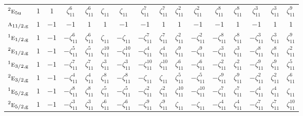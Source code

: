 \documentclass[10pt,a4paper]{article}
\makeatletter
\def\grouprule#1#2{\noalign{\marks\LTgroupmarks{\the\belowrulesep}\nobreak\vskip#1%
  \vskip\aboverulesep}\multispan\LT@cols\unskip{\leaders\hrule\@height#2\hfill\kern\z@}\cr
  \noalign{\penalty\LTrulebreak\vskip\belowrulesep\global\@lastruleclass\z@}}
\numberwithin{equation}{section}
\newcommand{\irr}[1]{\text{\normalfont\scshape #1}}
\newcommand{\conjpair}[1]{{}^{#1}}
\newcommand{\ptag}[1]{\mathrm{#1}}
\newcommand{\rootunity}[1]{\zeta_{#1}}
\makeatother
\begin{document}
{\begin{longtable}{@{}lccccccccccccccc@{}}
$\conjpair{2}\irr{e}_{5\ptag{u}}$ & $1$ & $1$ & $\rootunity{11}^{6}$ & $\rootunity{11}^{6}$ & $\rootunity{11}$ & $\rootunity{11}$ & $\rootunity{11}^{7}$ & $\rootunity{11}^{7}$ & $\rootunity{11}^{2}$ & $\rootunity{11}^{2}$ & $\rootunity{11}^{8}$ & $\rootunity{11}^{8}$ & $\rootunity{11}^{3}$ & $\rootunity{11}^{3}$ & $\rootunity{11}^{9}$\\
\grouprule{0pt}{\lightrulewidth}
$\irr{a}_{11/2,\ptag{g}}$ & $1$ & $-1$ & $-1$ & $1$ & $1$ & $-1$ & $-1$ & $1$ & $1$ & $-1$ & $-1$ & $1$ & $-1$ & $1$ & $1$\\
$\conjpair{1}\irr{e}_{1/2,\ptag{g}}$ & $1$ & $-1$ & $-\rootunity{11}^{6}$ & $\rootunity{11}^{6}$ & $\rootunity{11}$ & $-\rootunity{11}$ & $-\rootunity{11}^{7}$ & $\rootunity{11}^{7}$ & $\rootunity{11}^{2}$ & $-\rootunity{11}^{2}$ & $-\rootunity{11}^{8}$ & $\rootunity{11}^{8}$ & $-\rootunity{11}^{3}$ & $\rootunity{11}^{3}$ & $\rootunity{11}^{9}$\\
$\conjpair{2}\irr{e}_{1/2,\ptag{g}}$ & $1$ & $-1$ & $-\rootunity{11}^{5}$ & $\rootunity{11}^{5}$ & $\rootunity{11}^{10}$ & $-\rootunity{11}^{10}$ & $-\rootunity{11}^{4}$ & $\rootunity{11}^{4}$ & $\rootunity{11}^{9}$ & $-\rootunity{11}^{9}$ & $-\rootunity{11}^{3}$ & $\rootunity{11}^{3}$ & $-\rootunity{11}^{8}$ & $\rootunity{11}^{8}$ & $\rootunity{11}^{2}$\\
$\conjpair{1}\irr{e}_{3/2,\ptag{g}}$ & $1$ & $-1$ & $-\rootunity{11}^{7}$ & $\rootunity{11}^{7}$ & $\rootunity{11}^{3}$ & $-\rootunity{11}^{3}$ & $-\rootunity{11}^{10}$ & $\rootunity{11}^{10}$ & $\rootunity{11}^{6}$ & $-\rootunity{11}^{6}$ & $-\rootunity{11}^{2}$ & $\rootunity{11}^{2}$ & $-\rootunity{11}^{9}$ & $\rootunity{11}^{9}$ & $\rootunity{11}^{5}$\\
$\conjpair{2}\irr{e}_{3/2,\ptag{g}}$ & $1$ & $-1$ & $-\rootunity{11}^{4}$ & $\rootunity{11}^{4}$ & $\rootunity{11}^{8}$ & $-\rootunity{11}^{8}$ & $-\rootunity{11}$ & $\rootunity{11}$ & $\rootunity{11}^{5}$ & $-\rootunity{11}^{5}$ & $-\rootunity{11}^{9}$ & $\rootunity{11}^{9}$ & $-\rootunity{11}^{2}$ & $\rootunity{11}^{2}$ & $\rootunity{11}^{6}$\\
$\conjpair{1}\irr{e}_{5/2,\ptag{g}}$ & $1$ & $-1$ & $-\rootunity{11}^{8}$ & $\rootunity{11}^{8}$ & $\rootunity{11}^{5}$ & $-\rootunity{11}^{5}$ & $-\rootunity{11}^{2}$ & $\rootunity{11}^{2}$ & $\rootunity{11}^{10}$ & $-\rootunity{11}^{10}$ & $-\rootunity{11}^{7}$ & $\rootunity{11}^{7}$ & $-\rootunity{11}^{4}$ & $\rootunity{11}^{4}$ & $\rootunity{11}$\\
$\conjpair{2}\irr{e}_{5/2,\ptag{g}}$ & $1$ & $-1$ & $-\rootunity{11}^{3}$ & $\rootunity{11}^{3}$ & $\rootunity{11}^{6}$ & $-\rootunity{11}^{6}$ & $-\rootunity{11}^{9}$ & $\rootunity{11}^{9}$ & $\rootunity{11}$ & $-\rootunity{11}$ & $-\rootunity{11}^{4}$ & $\rootunity{11}^{4}$ & $-\rootunity{11}^{7}$ & $\rootunity{11}^{7}$ & $\rootunity{11}^{10}$\\

\end{longtable}}
\end{document}
